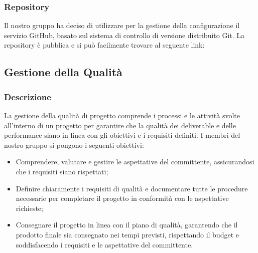 \subsubsection{Repository}
Il nostro gruppo ha deciso di utilizzare per la gestione della configurazione il servizio GitHub, 
basato sul sistema di controllo di versione distribuito Git.
La repository è pubblica e si può facilmente trovare al seguente link:









\subsection{Gestione della Qualità}
\subsubsection{Descrizione}
La gestione della qualità di progetto comprende i processi e le attività svolte all’interno di un progetto per garantire 
che la qualità dei deliverable e delle performance siano in linea con gli obiettivi e i requisiti definiti.
I membri del nostro gruppo si pongono i seguenti obiettivi:
\begin{itemize}
    \item Comprendere, valutare e gestire le aspettative del committente, assicurandosi che i requisiti siano rispettati;
    \item Definire chiaramente i requisiti di qualità e documentare tutte le procedure necessarie per completare 
            il progetto in conformità con le aspettative richieste;
    \item Consegnare il progetto in linea con il piano di qualità, garantendo che il prodotto finale sia consegnato 
            nei tempi previsti, rispettando il budget e soddisfacendo i requisiti e le aspettative del committente.
\end{itemize}

